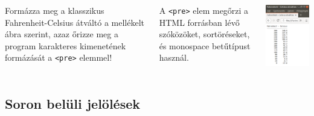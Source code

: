 \documentclass[usenames,dvipsnames,aspectratio=169]{beamer}
\begin{document}
\begin{frame}
  \begin{columns}[c]
      Formázza meg a klasszikus Fahrenheit-Celsius átváltó 
        
      a mellékelt ábra szerint, azaz őrizze meg a program karakteres kimenetének formázását 
      a \texttt{<pre>} elemmel!
      
      A \texttt{<pre>} elem megőrzi a HTML forrásban lévő szóközöket, sortöréseket, és monospace betűtípust használ.
      \begin{center}
        \begin{exampleblock}{}
          \centering \includegraphics[scale=.35]{fahrcels.png}
        \end{exampleblock}
      \end{center}
  \end{columns}
\end{frame}

\subsection{Soron belüli jelölések}
\end{document}
